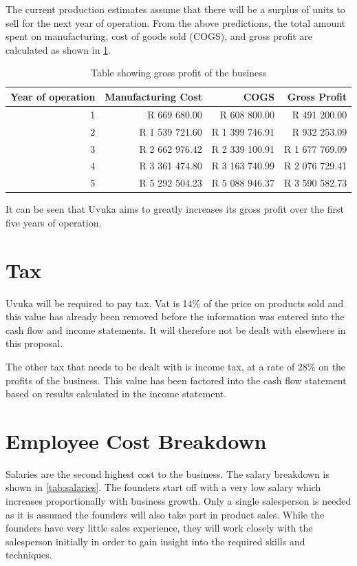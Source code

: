 The current production estimates assume that there will be a surplus of units to sell for the next year of operation. From the above predictions, the total amount spent on manufacturing, cost of goods sold (COGS), and gross profit are calculated as shown in \cref{tab:GrossProfit}. 

\begin{table}[htbp]
  \centering
  \caption{Table showing gross profit of the business}
    \begin{tabular}{rrrr}
    \toprule
    Year of operation & Manufacturing Cost & COGS  & Gross Profit \\
    \midrule
    1     & R 669 680.00 & R 608 800.00 & R 491 200.00 \\
    2     & R 1 539 721.60 & R 1 399 746.91 & R 932 253.09 \\
    3     & R 2 662 976.42 & R 2 339 100.91 & R 1 677 769.09 \\
    4     & R 3 361 474.80 & R 3 163 740.99 & R 2 076 729.41 \\
    5     & R 5 292 504.23 & R 5 088 946.37 & R 3 590 582.73 \\
    \bottomrule
    \end{tabular}%
  \label{tab:GrossProfit}%
\end{table}%

It can be seen that Uvuka aims to greatly increases its gross profit over the first five years of operation. 

\section{Tax}

Uvuka will be required to pay tax. Vat is 14\% of the price on products sold and this value has already been removed before the information was entered into the cash flow and income statements. It will therefore not be dealt with elsewhere in this proposal.

The other tax that needs to be dealt with is income tax, at a rate of 28\% on the profits of the business. This value has been factored into the cash flow statement based on results calculated in the income statement.

\section{Employee Cost Breakdown}
Salaries are the second highest cost to the business. The salary breakdown is shown in \cref{tab:salaries}. The founders start off with a very low salary which increases proportionally with business growth. Only a single salesperson is needed as it is assumed the founders will also take part in product sales. While the founders have very little sales experience, they will work closely with the salesperson initially in order to gain insight into the required skills and techniques.

